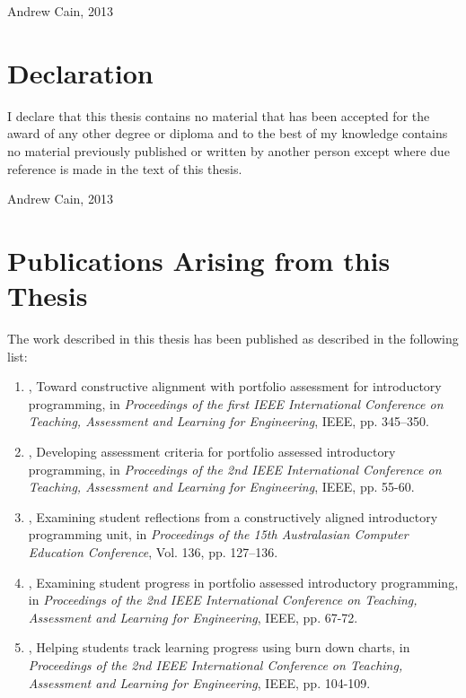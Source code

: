 \vspace*{2cm}
Andrew Cain, 2013


\cleardoublepage

\chapter*{Declaration}
I declare that this thesis contains no material that has been accepted for the award of any other degree or diploma and to the best of my knowledge contains no material previously published or written by another person except where due reference is made in the text of this thesis.

\vspace*{4cm} Andrew Cain, 2013

\cleardoublepage

\chapter*{Publications Arising from this Thesis}
\vspace{-0.5cm}

The work described in this thesis has been published as described in the following list:
\begin{enumerate}
	\item \citet{Cain:2012a}, Toward constructive alignment with portfolio assessment for introductory programming, in \emph{Proceedings of the first IEEE International Conference on Teaching, Assessment and Learning for Engineering}, IEEE, pp. 345–350.

	\item \citet{Cain:2013c}, Developing assessment criteria for portfolio assessed introductory programming, in \emph{Proceedings of the 2nd IEEE International Conference on Teaching, Assessment and Learning for Engineering}, IEEE, pp. 55-60.

	\item \citet{Cain:2013a}, Examining student reflections from a constructively aligned introductory programming unit, in \emph{Proceedings of the 15th Australasian Computer Education Conference}, Vol. 136, pp. 127–136.

	\item \citet{Cain:2013b}, Examining student progress in portfolio assessed introductory programming, in \emph{Proceedings of the 2nd IEEE International Conference on Teaching, Assessment and Learning for Engineering}, IEEE, pp. 67-72.

	\item \citet{Woodward:2013}, Helping students track learning progress using burn down charts, in \emph{Proceedings of the 2nd IEEE International Conference on Teaching, Assessment and Learning for Engineering}, IEEE, pp. 104-109.

\end{enumerate}

